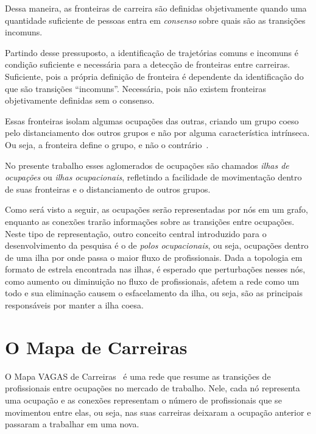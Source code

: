 \documentclass[
  article,
  11pt,
  a4paper,
  english,
  brazil,
  sumario=tradicional]{abntex2}
\begin{document}
Dessa maneira, as fronteiras de carreira são definidas objetivamente quando uma quantidade suficiente de pessoas entra em \textit{consenso} sobre quais são as transições incomuns.

Partindo desse pressuposto, a identificação de trajetórias comuns e incomuns é condição suficiente e necessária para a detecção de fronteiras entre carreiras. Suficiente, pois a própria definição de fronteira é dependente da identificação do que são transições \enquote{incomuns}. Necessária, pois não existem fronteiras objetivamente definidas sem o consenso.

Essas fronteiras isolam algumas ocupações das outras, criando um grupo coeso pelo distanciamento dos outros grupos e não por alguma característica intrínseca.  Ou seja, a fronteira define o grupo, e não o contrário~\cite{Gunz2007-hr,Abbott1995-ft}. 

No presente trabalho esses aglomerados de ocupações são chamados \textit{ilhas de ocupações} ou \textit{ilhas ocupacionais}, refletindo a facilidade de movimentação dentro de suas fronteiras e o distanciamento de outros grupos.

Como será visto a seguir, as ocupações serão representadas por nós em um grafo, enquanto as conexões trarão informações sobre as transições entre ocupações. Neste tipo de representação, outro conceito central introduzido para o desenvolvimento da pesquisa é o de \textit{polos ocupacionais}, ou seja, ocupações dentro de uma ilha por onde passa o maior fluxo de profissionais. Dada a topologia em formato de estrela encontrada nas ilhas, é esperado que perturbações nesses nós, como aumento ou diminuição no fluxo de profissionais, afetem a rede como um todo e sua eliminação causem o esfacelamento da ilha, ou seja, são as principais responsáveis por manter a ilha coesa. 

\section{O Mapa de Carreiras} \label{sec:mapa}

O Mapa VAGAS de Carreiras~\cite{VAGAS_Tecnologia2014-yv} é uma rede que resume as transições de profissionais entre ocupações no mercado de trabalho. Nele, cada nó representa uma ocupação e as conexões representam o número de profissionais que se movimentou entre elas, ou seja, nas suas carreiras deixaram a ocupação anterior e passaram a trabalhar em uma nova.
\end{document}
